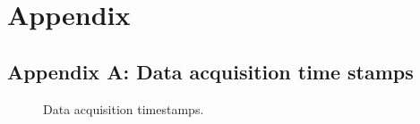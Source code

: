 \chapter{Appendix}
\label{cha:appendix}

\section{Appendix A: Data acquisition time stamps}
\label{sec:appendix-a}

\begin{figure}[!htb]
	\centering
	\caption{Data acquisition timestamps.}
\end{figure}